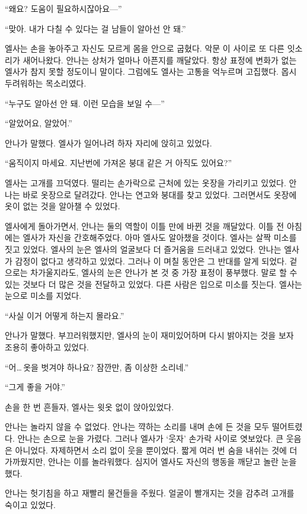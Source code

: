 ``왜요? 도움이 필요하시잖아요—''

``맞아. 내가 다칠 수 있다는 걸 남들이 알아선 안 돼.''

엘사는 손을 놓아주고 자신도 모르게 몸을 안으로 굽혔다. 악문 이 사이로 또 다른 잇소리가 새어나왔다. 안나는 상처가 얼마나 아픈지를 깨달았다. 항상 표정에 변화가 없는 엘사가 참지 못할 정도이니 말이다. 그럼에도 엘사는 고통을 억누르며 고집했다. 몹시 두려워하는 목소리였다.

``누구도 알아선 안 돼. 이런 모습을 보일 수—''

``알았어요, 알았어.''

안나가 말했다. 엘사가 일어나려 하자 자리에 앉히고 있었다.

``움직이지 마세요. 지난번에 가져온 붕대 같은 거 아직도 있어요?''

엘사는 고개를 끄덕였다. 떨리는 손가락으로 근처에 있는 옷장을 가리키고 있었다. 안나는 바로 옷장으로 달려갔다. 안나는 연고와 붕대를 찾고 있었다. 그러면서도 옷장에 옷이 없는 것을 알아챌 수 있었다.

엘사에게 돌아가면서, 안나는 둘의 역할이 이틀 만에 바뀐 것을 깨달았다. 이틀 전 아침에는 엘사가 자신을 간호해주었다. 아마 엘사도 알아챘을 것이다. 엘사는 살짝 미소를 짓고 있었다. 엘사의 눈은 엘사의 얼굴보다 더 즐거움을 드러내고 있었다. 안나는 엘사가 감정이 없다고 생각하고 있었다. 그러나 이 며칠 동안은 그 반대를 알게 되었다. 겉으로는 차가울지라도, 엘사의 눈은 안나가 본 것 중 가장 표정이 풍부했다. 말로 할 수 있는 것보다 더 많은 것을 전달하고 있었다. 다른 사람은 입으로 미소를 짓는다. 엘사는 눈으로 미소를 지었다.

``사실 이거 어떻게 하는지 몰라요.''

안나가 말했다. 부끄러워했지만, 엘사의 눈이 재미있어하며 다시 밝아지는 것을 보자 조용히 좋아하고 있었다.

``어\ldots\,옷을 벗겨야 하나요? 잠깐만, 좀 이상한 소리네.''

``그게 좋을 거야.''

손을 한 번 흔들자, 엘사는 윗옷 없이 앉아있었다.

안나는 놀라지 않을 수 없었다. 안나는 꺅하는 소리를 내며 손에 든 것을 모두 떨어트렸다. 안나는 손으로 눈을 가렸다. 그러나 엘사가 `웃자' 손가락 사이로 엿보았다. 큰 웃음은 아니었다. 자제하면서 소리 없이 웃을 뿐이었다. 짧게 여러 번 숨을 내쉬는 것에 더 가까웠지만, 안나는 이를 놀라워했다. 심지어 엘사도 자신의 행동을 깨닫고 놀란 눈을 했다.

안나는 헛기침을 하고 재빨리 물건들을 주웠다. 얼굴이 빨개지는 것을 감추려 고개를 숙이고 있었다.

